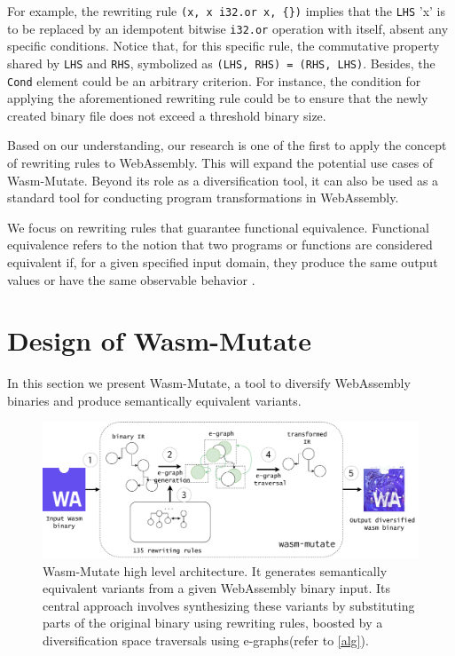 \documentclass[a4paper,fleqn]{cas-dc}
\newcommand{\tool}{{\sc Wasm-Mutate}\xspace}
\begin{document}
For example, the rewriting rule \texttt{(x,\ x\ i32.or\ x, \{\})} implies that the \texttt{LHS} 'x' is to be replaced by an idempotent bitwise \texttt{i32.or} operation with itself, absent any specific conditions.
Notice that, for this specific rule, the commutative property shared by \texttt{LHS} and \texttt{RHS}, symbolized as \texttt{(LHS, RHS) = (RHS, LHS)}.
Besides, the \texttt{Cond} element could be an arbitrary criterion. 
For instance, the condition for applying the aforementioned rewriting rule could be to ensure that the newly created binary file does not exceed a threshold binary size.

Based on our understanding, our research is one of the first to apply the concept of rewriting rules to WebAssembly.
This will expand the potential use cases of \tool. 
Beyond its role as a diversification tool, it can also be used as a standard tool for conducting program transformations in WebAssembly.


We focus on rewriting rules that guarantee functional equivalence. Functional equivalence refers to the notion that two programs or functions are considered equivalent if, for a given specified input domain, they produce the same output values or have the same observable behavior \cite{10.1145/2594291.2594334}. 






\section {Design of \tool}
\label{tech}

In this section we present \tool, a tool to diversify
WebAssembly binaries and produce semantically equivalent variants.
\begin{figure}[h!]
    \centering
    \includegraphics[width=0.9\linewidth]{figures/workflow.v2.pdf}
    \caption{ \tool high level architecture.  It generates semantically equivalent variants from a given WebAssembly binary input. 
    Its central approach involves synthesizing these variants by substituting parts of the original binary using rewriting rules, boosted by a diversification space traversals using e-graphs(refer to \autoref{alg}).}
  \label{fig:wasm-mutate}
\end{figure}
\end{document}
